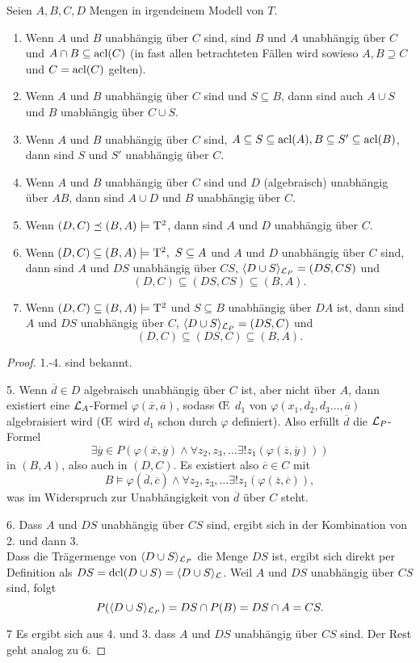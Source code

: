\begin{lemma}\label{Unabhängigkeitsregeln}
	Seien $A,B,C,D$ Mengen in irgendeinem Modell von $T$.
	\begin{enumerate}
		\item Wenn $A$ und $B$ unabhängig über $C$ sind, sind $B$ und $A$ unabhängig über $C$ und $A\cap B\subseteq\operatorname{acl}(C)$ (in fast allen betrachteten Fällen wird sowieso $A,B\supseteq C$ und $C=\operatorname{acl}(C)$ gelten).
		\item Wenn $A$ und $B$ unabhängig über $C$ sind und $S\subseteq B$, dann sind auch $A\cup S$ und $B$ unabhängig über $C\cup S$.
		\item Wenn $A$ und $B$ unabhängig über $C$ sind, $A\subseteq S\subseteq\operatorname{acl}(A),B\subseteq S'\subseteq\operatorname{acl}(B)$, dann sind $S$ und $S'$ unabhängig über $C$.
		\item Wenn $A$ und $B$ unabhängig über $C$ sind und $D$ (algebraisch) unabhängig über $AB$, dann sind $A\cup D$ und $B$ unabhängig über $C$.
		\item Wenn $(D,C)\preceq(B,A)\models\operatorname{T^2}$, dann sind $A$ und $D$ unabhängig über $C$.
		\item Wenn $(D,C)\subseteq(B,A)\models\tq,\ S\subseteq A$ und $A$ und $D$ unabhängig über $C$ sind, dann sind $A$ und $DS$ unabhängig über $CS$, $\langle D\cup S\rangle_{\mathcal{L}_P}=(DS,CS)$ und $$(D,C)\subseteq(DS,CS)\subseteq(B,A).$$
		\item Wenn $(D,C)\subseteq(B,A)\models\operatorname{T^2}$ und $S\subseteq B$ unabhängig über $DA$ ist, dann sind $A$ und $DS$ unabhängig über $C$, $\langle D\cup S\rangle_{\mathcal{L}_P}=(DS,C)$ und $$(D,C)\subseteq(DS,C)\subseteq(B,A).$$
	\end{enumerate}
\end{lemma}
\newpage
\begin{proof}
	1.-4. sind bekannt.
	\item[5.] Wenn $\overline{d}\in D$ algebraisch unabhängig über $C$ ist, aber nicht über $A$, dann existiert eine $\mathcal{L}_A$-Formel $\varphi(\overline{x},\overline{a})$, sodass \OE\ $d_1$ von $\varphi(x_1,d_2,d_3\dots,\overline{a})$ algebraisiert wird (\OE\ wird $d_1$ schon durch $\varphi$ definiert). Also erfüllt $\overline{d}$ die $\mathcal{L}_P$-Formel $$\exists \overline{y}\in P(\varphi(\overline{x},\overline{y})\land\forall z_2,z_3,\dots\exists! z_1(\varphi(\overline{z},\overline{y})))$$ in $(B,A)$, also auch in $(D,C)$. Es existiert also $\overline{c}\in C$ mit $$B\models\varphi(\overline{d},\overline{c})\land\forall z_2,z_3,\dots\exists! z_1(\varphi(\overline{z},\overline{c})),$$ was im Widerspruch zur Unabhängigkeit von $\overline{d}$ über $C$ steht.
	\item[6.] Dass $A$ und $DS$ unabhängig über $CS$ sind, ergibt sich in der Kombination von 2. und dann 3.\\
	Dass die Trägermenge von $\langle D\cup S\rangle_{\mathcal{L}_P}$ die Menge $DS$ ist, ergibt sich direkt per Definition als $DS=\operatorname{dcl}(D\cup S)=\langle D\cup S\rangle_{\mathcal{L}}$. Weil $A$ und $DS$ unabhängig über $CS$ sind, folgt $$P(\langle D\cup S\rangle_{\mathcal{L}_P})=DS\cap P(B)=DS\cap A=CS.$$
	\item[7] Es ergibt sich aus 4. und 3. dass $A$ und $DS$ unabhängig über $CS$ sind. Der Rest geht analog zu 6.
\end{proof}

